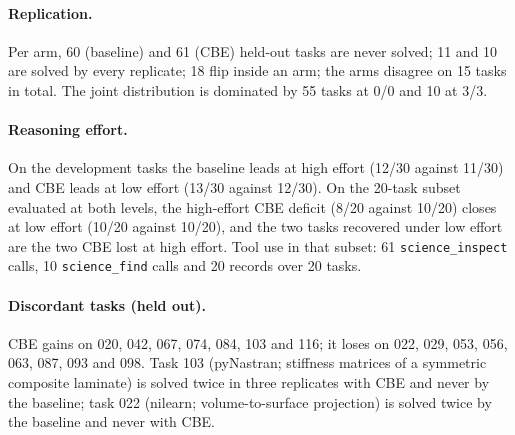 \paragraph{Replication.}
Per arm, 60 (baseline) and 61 (CBE) held-out tasks are never solved; 11 and 10 are solved by every
replicate; 18 flip inside an arm; the arms disagree on 15 tasks in total. The joint distribution is
dominated by 55 tasks at 0/0 and 10 at 3/3.

\paragraph{Reasoning effort.}
On the development tasks the baseline leads at high effort (12/30 against 11/30) and CBE leads at
low effort (13/30 against 12/30). On the 20-task subset evaluated at both levels, the high-effort
CBE deficit (8/20 against 10/20) closes at low effort (10/20 against 10/20), and the two tasks
recovered under low effort are the two CBE lost at high effort. Tool use in that subset: 61
\texttt{science\_inspect} calls, 10 \texttt{science\_find} calls and 20 records over 20 tasks.

\paragraph{Discordant tasks (held out).}
CBE gains on 020, 042, 067, 074, 084, 103 and 116; it loses on 022, 029, 053, 056, 063, 087, 093
and 098. Task 103 (pyNastran; stiffness matrices of a symmetric composite laminate) is solved
twice in three replicates with CBE and never by the baseline; task 022 (nilearn; volume-to-surface
projection) is solved twice by the baseline and never with CBE.
